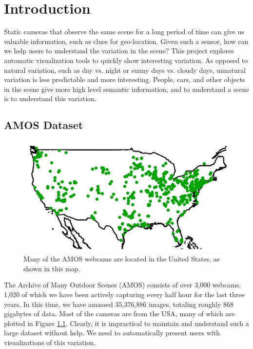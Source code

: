 \chapter{Introduction}
\label{cpt:intro}

Static cameras that observe the same scene for a long period of time can give us valuable information, such as clues for geo-location\cite{jacobs08geoorient}.  Given such a sensor, how can we help users to understand the variation in the scene?  This project explores automatic visualization tools to quickly show interesting variation.  As opposed to natural variation, such as day vs. night or sunny days vs. cloudy days, unnatural variation is less predictable and more interesting.  People, cars, and other objects in the scene give more high level semantic information, and to understand a scene is to understand this variation.


\section{AMOS Dataset}

\begin{figure}[ht]
\centering
\includegraphics[width = 1\textwidth]{figures/localizationMap.jpg}
\caption[Map of known webcam locations from the AMOS dataset.]{Many of the AMOS webcams are located in the United States, as shown in this map.}
\label{fig:localizationMap}
\end{figure}

The Archive of Many Outdoor Scenes (AMOS) consists of over 3,000 webcams, 1,020 of which we have been actively capturing every half hour for the last three years.  In this time, we have amassed 35,376,886 images, totaling roughly 868 gigabytes of data.  Most of the cameras are from the USA, many of which are plotted in Figure \ref{fig:localizationMap}.  Clearly, it is impractical to maintain and understand such a large dataset without help.  We need to automatically present users with visualizations of this variation.



